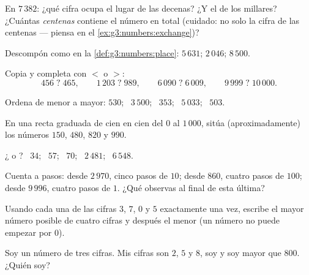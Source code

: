 \begin{exercise}[$\star$]\label{exo:g3:numbers:3}
En $7\,382$: ¿qué cifra ocupa el lugar de las decenas? ¿Y el de los millares?
¿Cuántas \emph{centenas} contiene el número en total
(cuidado: no solo la cifra de las centenas --- piensa en el
\cref{ex:g3:numbers:exchange})?
\end{exercise}

\begin{exercise}[$\star$]\label{exo:g3:numbers:4}
Descompón como en la \cref{def:g3:numbers:place}:
$5\,631$; \quad $2\,046$; \quad $8\,500$.
\end{exercise}

\begin{exercise}[$\star$]\label{exo:g3:numbers:5}
Copia y completa con $<$ o $>$:
\[
456 \;?\; 465, \qquad
1\,203 \;?\; 989, \qquad
6\,090 \;?\; 6\,009, \qquad
9\,999 \;?\; 10\,000 .
\]
\end{exercise}

\begin{exercise}[$\star$]\label{exo:g3:numbers:6}
Ordena de menor a mayor: $530$; \ $3\,500$; \ $353$; \ $5\,033$;
\ $503$.
\end{exercise}

\begin{exercise}[$\star$]\label{exo:g3:numbers:7}
En una recta graduada de cien en cien del $0$ al $1\,000$, sitúa
(aproximadamente) los números $150$, $480$, $820$ y $990$.
\end{exercise}

\begin{exercise}[$\star$]\label{exo:g3:numbers:8}
¿ o ? \ $34$; \ $57$; \ $70$; \ $2\,481$; \ $6\,548$.
\end{exercise}

\begin{exercise}[$\star$]\label{exo:g3:numbers:9}
Cuenta a pasos: desde $2\,970$, cinco pasos de $10$; desde $860$,
cuatro pasos de $100$; desde $9\,996$, cuatro pasos de $1$.
¿Qué observas al final de esta última?
\end{exercise}

\begin{exercise}[$\star\star$]\label{exo:g3:numbers:10}
Usando cada una de las cifras $3$, $7$, $0$ y $5$ exactamente una vez, escribe el
mayor número posible de cuatro cifras y después el menor (un número
no puede empezar por $0$).
\end{exercise}

\begin{exercise}[$\star\star$]\label{exo:g3:numbers:11}
Soy un número de tres cifras. Mis cifras son $2$, $5$ y $8$, soy 
y soy mayor que $800$. ¿Quién soy?
\end{exercise}
